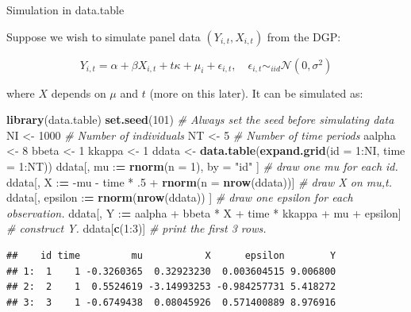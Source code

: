 \documentclass[10pt,ignorenonframetext,]{beamer}
\newenvironment{Shaded}{\begin{snugshade}}{\end{snugshade}}
\newcommand{\KeywordTok}[1]{\textcolor[rgb]{0.13,0.29,0.53}{\textbf{{#1}}}}
\newcommand{\DataTypeTok}[1]{\textcolor[rgb]{0.13,0.29,0.53}{{#1}}}
\newcommand{\DecValTok}[1]{\textcolor[rgb]{0.00,0.00,0.81}{{#1}}}
\newcommand{\StringTok}[1]{\textcolor[rgb]{0.31,0.60,0.02}{{#1}}}
\newcommand{\CommentTok}[1]{\textcolor[rgb]{0.56,0.35,0.01}{\textit{{#1}}}}
\newcommand{\ErrorTok}[1]{\textcolor[rgb]{0.64,0.00,0.00}{\textbf{{#1}}}}
\newcommand{\NormalTok}[1]{{#1}}
\begin{document}
\begin{frame}[fragile]{Simulation in data.table}

Suppose we wish to simulate panel data \((Y_{i,t},X_{i,t})\) from the
DGP:

\[
Y_{i,t} = \alpha + \beta X_{i,t} + t\kappa  + \mu_i + \epsilon_{i,t}, \quad \epsilon_{i,t} \sim_{iid} \mathcal{N}(0,\sigma^2)
\]

where \(X\) depends on \(\mu\) and \(t\) (more on this later). It can be
simulated as:

\footnotesize

\begin{Shaded}
\begin{Highlighting}[]
\KeywordTok{library}\NormalTok{(data.table)}
\KeywordTok{set.seed}\NormalTok{(}\DecValTok{101}\NormalTok{) }\CommentTok{# Always set the seed before simulating data}
\NormalTok{NI <-}\StringTok{ }\DecValTok{1000} \CommentTok{# Number of individuals}
\NormalTok{NT <-}\StringTok{ }\DecValTok{5} \CommentTok{# Number of time periods}
\NormalTok{aalpha <-}\StringTok{ }\DecValTok{8}
\NormalTok{bbeta <-}\StringTok{ }\DecValTok{1}
\NormalTok{kkappa <-}\StringTok{ }\DecValTok{1}
\NormalTok{ddata <-}\StringTok{ }\KeywordTok{data.table}\NormalTok{(}\KeywordTok{expand.grid}\NormalTok{(}\DataTypeTok{id =} \DecValTok{1}\NormalTok{:NI, }\DataTypeTok{time =} \DecValTok{1}\NormalTok{:NT))}
\NormalTok{ddata[, mu :}\ErrorTok{=}\StringTok{ }\KeywordTok{rnorm}\NormalTok{(}\DataTypeTok{n =} \DecValTok{1}\NormalTok{), by =}\StringTok{ "id"} \NormalTok{] }\CommentTok{# draw one mu for each id.}
\NormalTok{ddata[, X :}\ErrorTok{=}\StringTok{ }\NormalTok{-mu -}\StringTok{ }\NormalTok{time *}\StringTok{ }\NormalTok{.}\DecValTok{5} \NormalTok{+}\StringTok{ }\KeywordTok{rnorm}\NormalTok{(}\DataTypeTok{n =} \KeywordTok{nrow}\NormalTok{(ddata))] }\CommentTok{# draw X on mu,t.}
\NormalTok{ddata[, epsilon :}\ErrorTok{=}\StringTok{ }\KeywordTok{rnorm}\NormalTok{(}\KeywordTok{nrow}\NormalTok{(ddata)) ] }\CommentTok{# draw one epsilon for each observation.}
\NormalTok{ddata[, Y :}\ErrorTok{=}\StringTok{ }\NormalTok{aalpha +}\StringTok{ }\NormalTok{bbeta *}\StringTok{ }\NormalTok{X +}\StringTok{ }\NormalTok{time *}\StringTok{ }\NormalTok{kkappa +}\StringTok{ }\NormalTok{mu +}\StringTok{ }\NormalTok{epsilon] }\CommentTok{# construct Y.}
\NormalTok{ddata[}\KeywordTok{c}\NormalTok{(}\DecValTok{1}\NormalTok{:}\DecValTok{3}\NormalTok{)] }\CommentTok{# print the first 3 rows.}
\end{Highlighting}
\end{Shaded}

\begin{verbatim}
##    id time         mu           X      epsilon        Y
## 1:  1    1 -0.3260365  0.32923230  0.003604515 9.006800
## 2:  2    1  0.5524619 -3.14993253 -0.984257731 5.418272
## 3:  3    1 -0.6749438  0.08045926  0.571400889 8.976916
\end{verbatim}

\normalsize

\end{frame}
\end{document}
